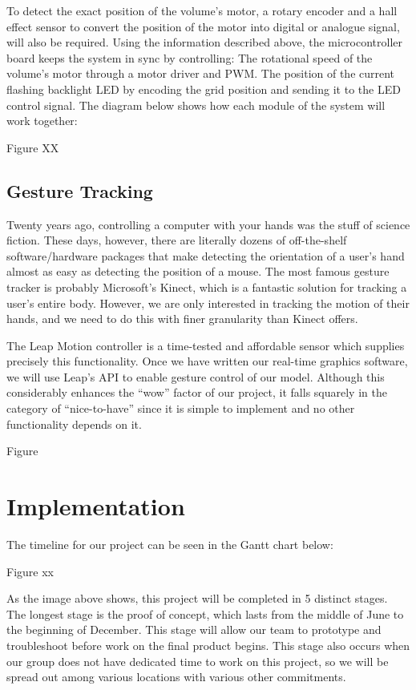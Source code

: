 \documentclass[12pt]{article}
\begin{document}
To detect the exact position of the volume’s motor, a rotary encoder and a hall effect sensor to convert the position of the motor into digital or analogue signal, will also be required.
Using the information described above, the microcontroller board keeps the system in sync by controlling:
The rotational speed of the volume’s motor through a motor driver and PWM.
The position of the current flashing backlight LED by encoding the grid position and sending it to the LED control signal.
The diagram below shows how each module of the system will work together:

Figure XX

\subsection{Gesture Tracking}
Twenty years ago, controlling a computer with your hands was the stuff of science fiction. These days, however, there are literally dozens of off-the-shelf software/hardware packages that make detecting the orientation of a user’s hand almost as easy as detecting the position of a mouse. The most famous gesture tracker is probably Microsoft’s Kinect, which is a fantastic solution for tracking a user’s entire body. However, we are only interested in tracking the motion of their hands, and we need to do this with finer granularity than Kinect offers.

The Leap Motion controller is a time-tested and affordable sensor which supplies precisely this functionality. Once we have written our real-time graphics software, we will use Leap’s API to enable gesture control of our model. Although this considerably enhances the “wow” factor of our project, it falls squarely in the category of “nice-to-have” since it is simple to implement and no other functionality depends on it.

Figure

\section{Implementation}
The timeline for our project can be seen in the Gantt chart below:

Figure xx

As the image above shows, this project will be completed in 5 distinct stages. The longest stage is the proof of concept, which lasts from the middle of June to the beginning of December. This stage will allow our team to prototype and troubleshoot before work on the final product begins. This stage also occurs when our group does not have dedicated time to work on this project, so we will be spread out among various locations with various other commitments. 
\end{document}
